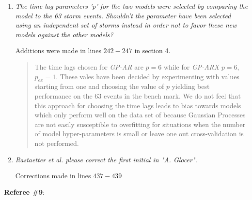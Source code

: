 \documentclass{article}
\begin{document}
\begin{enumerate}
\item \emph{The time lag parameters 'p' for the two models were selected by comparing the model to the 63 storm events. Shouldn't the parameter have been selected using an independent set of storms instead in order not to favor these new models against the other models?}

Additions were made in lines $242-247$ in section 4. \blockquote{The time lags chosen for \emph{GP-AR} are $p = 6$ while for \emph{GP-ARX} $p=6$, $p_{ex} = 1$. These vales have been decided by experimenting with values starting from one and choosing the value of $p$ yielding best performance on the 63 events in the bench mark. We do not feel that this approach for choosing the time lags leads to bias towards models which only perform well on the data set of \cite{Ji2012} because Gaussian Processes are not easily susceptible to overfitting for situations when the number of model hyper-parameters is small or leave one out cross-validation is not performed.}

\item \emph{Rastaetter et al. please correct the first initial in "A. Glocer".} 

Corrections made in lines $437-439$

\end{enumerate}
\textbf{Referee \#9}: 
\end{document}
